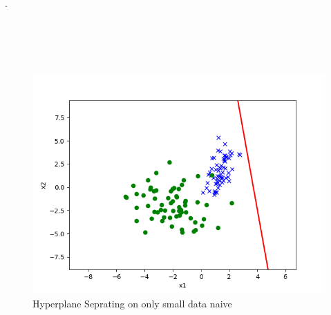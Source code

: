 \begin{answer}

. \\ \\ \\ \\ \\
\begin{figure}[h!]
\centering
  \includegraphics[width=.7\linewidth]{posonly/posonly_naive_pred.png}
\caption{Hyperplane Seprating on only small data naive}
\label{fig:test}
\end{figure}

\end{answer}
